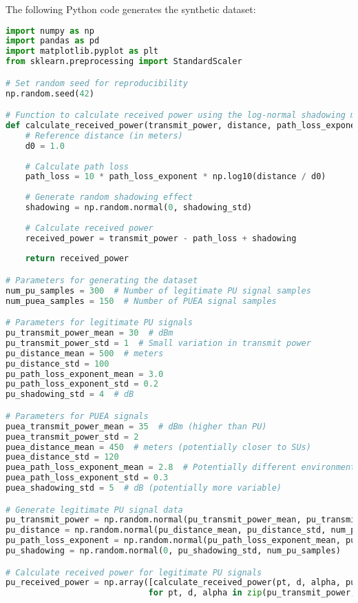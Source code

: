 The following Python code generates the synthetic dataset:

\begin{lstlisting}[language=Python, caption=Dataset Generation Code]
import numpy as np
import pandas as pd
import matplotlib.pyplot as plt
from sklearn.preprocessing import StandardScaler

# Set random seed for reproducibility
np.random.seed(42)

# Function to calculate received power using the log-normal shadowing model
def calculate_received_power(transmit_power, distance, path_loss_exponent, shadowing_std):
    # Reference distance (in meters)
    d0 = 1.0
    
    # Calculate path loss
    path_loss = 10 * path_loss_exponent * np.log10(distance / d0)
    
    # Generate random shadowing effect
    shadowing = np.random.normal(0, shadowing_std)
    
    # Calculate received power
    received_power = transmit_power - path_loss + shadowing
    
    return received_power

# Parameters for generating the dataset
num_pu_samples = 300  # Number of legitimate PU signal samples
num_puea_samples = 150  # Number of PUEA signal samples

# Parameters for legitimate PU signals
pu_transmit_power_mean = 30  # dBm
pu_transmit_power_std = 1  # Small variation in transmit power
pu_distance_mean = 500  # meters
pu_distance_std = 100
pu_path_loss_exponent_mean = 3.0
pu_path_loss_exponent_std = 0.2
pu_shadowing_std = 4  # dB

# Parameters for PUEA signals
puea_transmit_power_mean = 35  # dBm (higher than PU)
puea_transmit_power_std = 2
puea_distance_mean = 450  # meters (potentially closer to SUs)
puea_distance_std = 120
puea_path_loss_exponent_mean = 2.8  # Potentially different environment
puea_path_loss_exponent_std = 0.3
puea_shadowing_std = 5  # dB (potentially more variable)

# Generate legitimate PU signal data
pu_transmit_power = np.random.normal(pu_transmit_power_mean, pu_transmit_power_std, num_pu_samples)
pu_distance = np.random.normal(pu_distance_mean, pu_distance_std, num_pu_samples)
pu_path_loss_exponent = np.random.normal(pu_path_loss_exponent_mean, pu_path_loss_exponent_std, num_pu_samples)
pu_shadowing = np.random.normal(0, pu_shadowing_std, num_pu_samples)

# Calculate received power for legitimate PU signals
pu_received_power = np.array([calculate_received_power(pt, d, alpha, pu_shadowing_std) 
                             for pt, d, alpha in zip(pu_transmit_power, pu_distance, pu_path_loss_exponent)])


\end{lstlisting}
